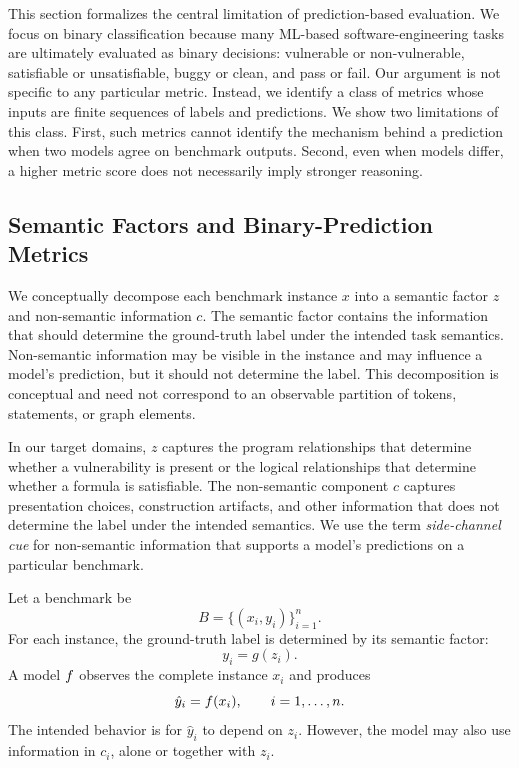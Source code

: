 \documentclass[acmsmall,screen,review,anonymous]{acmart}
\begin{document}
This section formalizes the central limitation of prediction-based
evaluation. We focus on binary classification because many ML-based
software-engineering tasks are ultimately evaluated as binary decisions:
vulnerable or non-vulnerable, satisfiable or unsatisfiable, buggy or clean,
and pass or fail. Our argument is not specific to any particular
metric. Instead, we identify a class of metrics whose inputs are finite
sequences of labels and predictions. We show two limitations of this class.
First, such metrics cannot identify the mechanism behind a prediction when
two models agree on benchmark outputs. Second, even when models differ, a
higher metric score does not necessarily imply stronger reasoning.

\subsection{Semantic Factors and Binary-Prediction Metrics}
\label{sec:semantic-binary-metrics}

We conceptually decompose each benchmark instance \(x\) into a semantic factor
\(z\) and non-semantic information \(c\). The semantic factor contains the
information that should determine the ground-truth label under the intended
task semantics. Non-semantic information may be visible in the instance and
may influence a model's prediction, but it should not determine the label.
This decomposition is conceptual and need not correspond to an observable
partition of tokens, statements, or graph elements.

In our target domains, \(z\) captures the program relationships that determine
whether a vulnerability is present or the logical relationships that determine
whether a formula is satisfiable. The non-semantic component \(c\) captures
presentation choices, construction artifacts, and other information that does
not determine the label under the intended semantics. We use the term
\emph{side-channel cue} for non-semantic information that supports a model's
predictions on a particular benchmark.

Let a benchmark be
\[
B=\{(x_i,y_i)\}_{i=1}^{n}.
\]
For each instance, the ground-truth label is determined by its semantic factor:
\[
y_i=g(z_i).
\]
A model \(f\) observes the complete instance \(x_i\) and produces
\[
\hat{y}_i=f(x_i),
\qquad i=1,\ldots,n.
\]
The intended behavior is for \(\hat{y}_i\) to depend on \(z_i\). However, the
model may also use information in \(c_i\), alone or together with \(z_i\).
\end{document}
